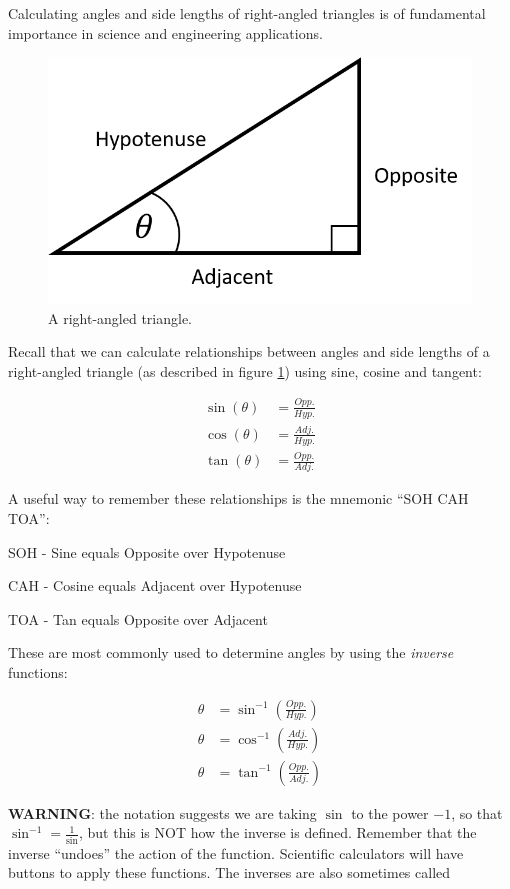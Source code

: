 \documentclass[
]{book}
\theoremstyle{definition}
\theoremstyle{definition}
\theoremstyle{definition}
\theoremstyle{definition}
\theoremstyle{remark}
\begin{document}
Calculating angles and side lengths of right-angled triangles is of fundamental importance in science and engineering applications.

\begin{figure}
\includegraphics{figures/rh-triangle} \caption{A right-angled triangle.}\label{fig:rh-triangle}
\end{figure}

Recall that we can calculate relationships between angles and side lengths of a right-angled triangle (as described in figure \ref{fig:rh-triangle}) using sine, cosine and tangent:

\begin{align*}
\sin(\theta)&=\frac{Opp.}{Hyp.}\\
\cos(\theta)&=\frac{Adj.}{Hyp.}\\
\tan(\theta)&=\frac{Opp.}{Adj.}
\end{align*}

A useful way to remember these relationships is the mnemonic ``SOH CAH TOA'':

SOH - Sine equals Opposite over Hypotenuse

CAH - Cosine equals Adjacent over Hypotenuse

TOA - Tan equals Opposite over Adjacent

These are most commonly used to determine angles by using the \emph{inverse} functions:

\begin{align*}
\theta&=\sin^{-1}(\frac{Opp.}{Hyp.})\\
\theta&=\cos^{-1}(\frac{Adj.}{Hyp.})\\
\theta&=\tan^{-1}(\frac{Opp.}{Adj.})
\end{align*}

\textbf{WARNING}: the notation suggests we are taking \(\sin\) to the power \(-1\), so that \(\sin^{-1}=\frac{1}{\sin}\), but this is NOT how the inverse is defined. Remember that the inverse ``undoes'' the action of the function. Scientific calculators will have buttons to apply these functions. The inverses are also sometimes called
\end{document}
